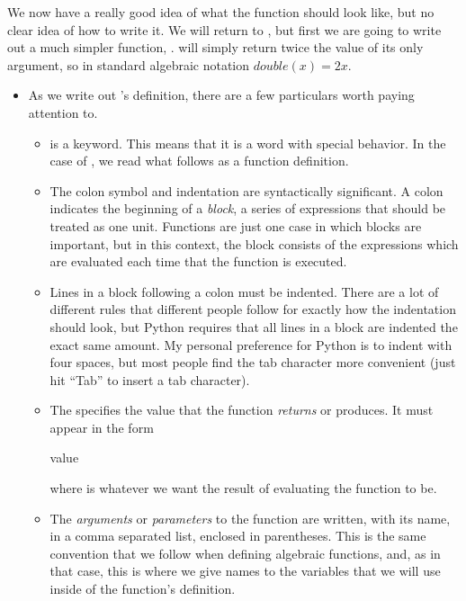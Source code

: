 We now have a really good idea of what the  function should look like, but no clear idea of how to write it.
We will return to , but first we are going to write out a much simpler function, .
 will simply return twice the value of its only argument, so in standard algebraic notation $double(x) = 2x$.

\begin{itemize}
    \item As we write out 's definition, there are a few particulars worth paying attention to.
        \begin{itemize}
            \item {} is a keyword.
                This means that it is a word with special behavior.
                In the case of , we read what follows as a function definition.
            \item The colon symbol and indentation are syntactically significant.
                A colon indicates the beginning of a \emph{block}, a series of expressions that should be treated as one unit.
                Functions are just one case in which blocks are important, but in this context, the block consists of the expressions which are evaluated each time that the function is executed.
            \item Lines in a block following a colon must be indented.
                There are a lot of different rules that different people follow for exactly how the indentation should look, but Python requires that all lines in a block are indented the exact same amount.
                My personal preference for Python is to indent with four spaces, but most people find the tab character more convenient (just hit ``Tab'' to insert a tab character).
            \item The  specifies the value that the function \emph{returns} or produces.
                It must appear in the form
\begin{codeblock}
 value
\end{codeblock}
                where  is whatever we want the result of evaluating the function to be.
            \item The \emph{arguments} or \emph{parameters} to the function are written, with its name, in a comma separated list, enclosed in parentheses.
                This is the same convention that we follow when defining algebraic functions, and, as in that case, this is where we give names to the variables that we will use inside of the function's definition.

\end{itemize}
\end{itemize}
